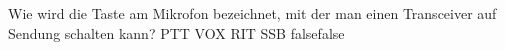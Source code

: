     {Wie wird die Taste am Mikrofon bezeichnet, mit der man einen Transceiver auf Sendung schalten kann?}
    {PTT}
    {VOX}
    {RIT}
    {SSB}
    {false}{false}